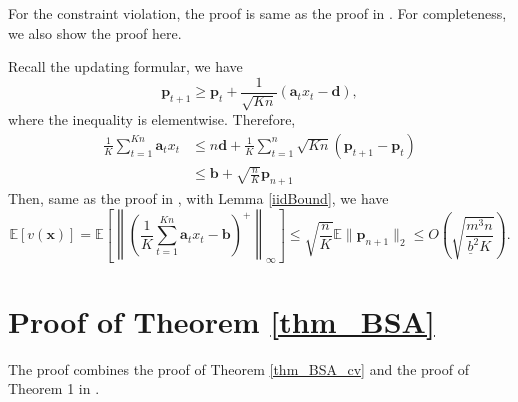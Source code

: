 \documentclass{article} %
\newcommand{\E}{\mathbb{E}}
\begin{document}
\begin{APPENDICES}
                For the constraint violation, the proof is same as the proof in \cite{li2020simple}. For completeness, we also show the proof here.
                
                Recall the updating formular, we have 
                $$
                    \bm{p}_{t+1}\geq\bm{p}_t+\frac{1}{\sqrt{Kn}}(\bm{a}_tx_t-\bm{d}),
                $$
                where the inequality is elementwise. Therefore, 
                \begin{align*}
                \frac{1}{K}\sum_{t=1}^{Kn} \bm{a}_tx_t & \le n\bm{d} + \frac{1}{K}\sum_{t=1}^n \sqrt{Kn}(\bm{p}_{t+1}-\bm{p}_{t}) \\
                & \le \bm{b} + \sqrt{\frac{n}{K}}\bm{p}_{n+1} 
                \end{align*}
                Then, same as the proof in \cite{li2020simple}, with Lemma \ref{iidBound}, we have 
                $$ \E \left[v(\bm{x})\right]= \E \left[\left \|\left(\frac{1}{K}\sum_{t=1}^{Kn} \bm{a}_tx_t-\bm{b}\right)^+\right\|_{\infty}\right] \le
                \sqrt{\frac{n}{K}}\E \|\bm{p}_{n+1}\|_2  \leq O\left(\sqrt{\frac{m^3n}{\underline{b}^2K}}\right).$$
    
    \section{Proof of Theorem \ref{thm_BSA}}
        The proof combines the proof of Theorem \ref{thm_BSA_cv} and the proof of Theorem 1 in \cite{balseiro2020best}. 


\end{APPENDICES}
\end{document}

